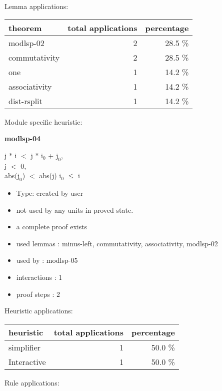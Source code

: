 \documentclass[a4paper]{article}
\begin{document}
Lemma applications:

\begin{supertabular}{l|r|r}
theorem	        & total applications & percentage \\ \hline
modlsp-02 & 2 & 28.5 \% \\
commutativity & 2 & 28.5 \% \\
one & 1 & 14.2 \% \\
associativity & 1 & 14.2 \% \\
dist-rsplit & 1 & 14.2 \% \\

\end{supertabular}

Module specific heuristic:

\pagebreak

{\LARGE\bf modlsp-04}\label{lemma-modlsp-04}

\medskip

j $*$ i $<$ j $*$ $\mbox{i}_{0}$ + $\mbox{j}_{0}$, \\
j $<$ 0, \\
abs($\mbox{j}_{0}$) $<$ abs(j) \Fol $\mbox{i}_{0}$ $\le$ i

\begin{itemize}

\item Type: created by user

\item not used by any units in proved state.
\item       a complete proof exists
\item       used lemmas  : minus-left, commutativity, associativity, modlsp-02
\item       used by      : modlsp-05
\item       interactions : 1
\item       proof steps  : 2
\end{itemize}

\medskip


Heuristic applications:

\begin{supertabular}{l|r|r}
heuristic	& total applications & percentage \\ \hline
simplifier & 1 & 50.0 \% \\
Interactive & 1 & 50.0 \% \\

\end{supertabular}

Rule applications:
\end{document}
